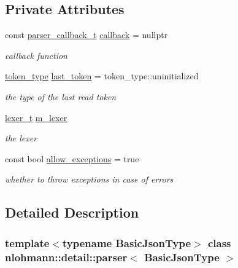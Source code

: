 \subsection*{Private Attributes}
\begin{DoxyCompactItemize}
\item 
const \hyperlink{classnlohmann_1_1detail_1_1parser_ad250ad4f2b4af4a497e727c963162ff1}{parser\+\_\+callback\+\_\+t} \hyperlink{classnlohmann_1_1detail_1_1parser_a7600d272ec605e3ffdc8512b3585f476}{callback} = nullptr
\begin{DoxyCompactList}\small\item\em callback function \end{DoxyCompactList}\item 
\hyperlink{classnlohmann_1_1detail_1_1parser_a21d247111b332785b7acf3f8e487d117}{token\+\_\+type} \hyperlink{classnlohmann_1_1detail_1_1parser_a932e49f6f4d291557846744319245994}{last\+\_\+token} = token\+\_\+type\+::uninitialized
\begin{DoxyCompactList}\small\item\em the type of the last read token \end{DoxyCompactList}\item 
\hyperlink{classnlohmann_1_1detail_1_1parser_a16030c5af158a94d1c799f82ff3a0147}{lexer\+\_\+t} \hyperlink{classnlohmann_1_1detail_1_1parser_a22dcc815551a4052b87797b34171b352}{m\+\_\+lexer}
\begin{DoxyCompactList}\small\item\em the lexer \end{DoxyCompactList}\item 
const bool \hyperlink{classnlohmann_1_1detail_1_1parser_a3de1ea054cfa606e79fa07741f081b5f}{allow\+\_\+exceptions} = true
\begin{DoxyCompactList}\small\item\em whether to throw exceptions in case of errors \end{DoxyCompactList}\end{DoxyCompactItemize}


\subsection{Detailed Description}
\subsubsection*{template$<$typename Basic\+Json\+Type$>$\newline
class nlohmann\+::detail\+::parser$<$ Basic\+Json\+Type $>$}

